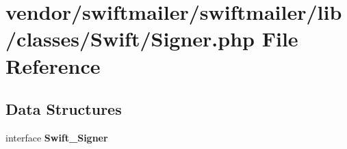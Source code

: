 \section{vendor/swiftmailer/swiftmailer/lib/classes/\+Swift/\+Signer.php File Reference}
\label{_signer_8php}
\subsection*{Data Structures}
\begin{DoxyCompactItemize}
\item 
interface {\bf Swift\+\_\+\+Signer}
\end{DoxyCompactItemize}
